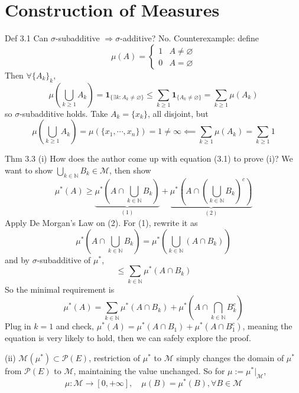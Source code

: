 \setcounter{section}{2}
\section{Construction of Measures}

\begin{note}{Def 3.1}
    Can $\sigma$-subadditive $\Rightarrow \sigma$-additive? No. Counterexample: define
    \[
    \mu(A)=\begin{cases}
        1 & A\neq \varnothing\\
        0 & A=\varnothing
    \end{cases}
    \]
    Then $\forall \{A_k\}_k$,
    \[
    \mu\left(
    \bigcup_{k\ge 1}A_k
    \right)=\mathbf{1}_{\{\exists k: A_k\neq\varnothing\}}\le \sum_{k\ge 1}\mathbf{1}_{\{A_k\neq\varnothing\}}=\sum_{k\ge 1}\mu(A_k)
    \]
    so $\sigma$-subadditive holds. Take $A_k=\{x_k\}$, all disjoint, but
    \[
    \mu\left(
    \bigcup_{k\ge 1}A_k
    \right)=\mu(\{x_1,\cdots,x_n\})=1\neq \infty\impliedby\sum_{k\ge 1}\mu(A_k)=\sum_{k\ge 1}1
    \]
\end{note}

\begin{note}{Thm 3.3}
    (i) How does the author come up with equation (3.1) to prove (i)? We want to show $\bigcup_{k\in\mathbb{N}}B_k\in\mathcal{M}$, then show
    \[
    \mu^*(A)\ge \underbrace{\mu^*\left(
    A\cap \bigcup_{k\in\mathbb{N}}B_k
    \right)}_{(1)}+\underbrace{\mu^*\left(
    A\cap \left(\bigcup_{k\in\mathbb{N}}B_k\right)^c
    \right)}_{(2)}
    \]
    Apply De Morgan's Law on (2). For (1), rewrite it as 
    \[
    \mu^*\left(
    A\cap \bigcup_{k\in\mathbb{N}}B_k
    \right)=\mu^*\left(
     \bigcup_{k\in\mathbb{N}} (A\cap B_k)
    \right)
    \]
    and by $\sigma$-subadditive of $\mu^*$, 
    \[
    \le \sum_{k\in\mathbb{N}}\mu^*(A\cap B_k)
    \]
    So the minimal requirement is
    \[
    \mu^*(A)=\sum_{k\in\mathbb{N}}\mu^*(A\cap B_k)+\mu^*\left(
    A\cap \bigcap_{k\in\mathbb{N}}B_k^c\right)
    \]
    Plug in $k=1$ and check, $\mu^*(A)=\mu^*(A\cap B_1)+\mu^*(A\cap B_1^c)$, meaning the equation is very likely to hold, then we can safely explore the proof.

    (ii) $\mathcal{M}(\mu^*)\subset \mathcal{P}(E)$, restriction of $\mu^*$ to $\mathcal{M}$ simply changes the domain of $\mu^*$ from $\mathcal{P}(E)$ to $\mathcal{M}$, maintaining the value unchanged. So for $\mu:=\mu^*|_{\mathcal{M}}$,
    \[
    \mu: \mathcal{M}\to [0,+\infty],\quad \mu(B)=\mu^*(B), \forall B\in \mathcal{M}
    \]
\end{note}

